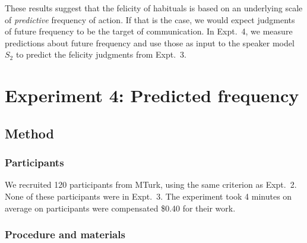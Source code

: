 \documentclass[10pt,letterpaper]{article}
\begin{document}
%
%
%
%

These results suggest that the felicity of habituals is based on an underlying scale of \emph{predictive} frequency of action.
If that is the case, we would expect judgments of future frequency to be the target of communication. 
In Expt.~4, we measure predictions about future frequency and use those as input to the speaker model $S_2$ to predict the felicity judgments from Expt.~3.


\section{Experiment 4: Predicted frequency}
\subsection{Method}
\subsubsection{Participants} 

We recruited 120 participants from MTurk, using the same criterion as Expt.~2.
None of these participants were in Expt.~3.
The experiment took 4 minutes on average on participants were compensated \$0.40 for their work.

\subsubsection{Procedure and materials}
\end{document}
